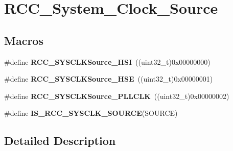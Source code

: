 \hypertarget{group___r_c_c___system___clock___source}{\section{R\-C\-C\-\_\-\-System\-\_\-\-Clock\-\_\-\-Source}
\label{group___r_c_c___system___clock___source}
}
\subsection*{Macros}
\begin{DoxyCompactItemize}
\item 
\hypertarget{group___r_c_c___system___clock___source_ga0f392254e74dd965c48edd5aad148e20}{\#define {\bfseries R\-C\-C\-\_\-\-S\-Y\-S\-C\-L\-K\-Source\-\_\-\-H\-S\-I}~((uint32\-\_\-t)0x00000000)}\label{group___r_c_c___system___clock___source_ga0f392254e74dd965c48edd5aad148e20}

\item 
\hypertarget{group___r_c_c___system___clock___source_gabeae110e41833842f8620647ea0ce85a}{\#define {\bfseries R\-C\-C\-\_\-\-S\-Y\-S\-C\-L\-K\-Source\-\_\-\-H\-S\-E}~((uint32\-\_\-t)0x00000001)}\label{group___r_c_c___system___clock___source_gabeae110e41833842f8620647ea0ce85a}

\item 
\hypertarget{group___r_c_c___system___clock___source_ga9301b7a07a7cb8c2c6ed87b619c1c966}{\#define {\bfseries R\-C\-C\-\_\-\-S\-Y\-S\-C\-L\-K\-Source\-\_\-\-P\-L\-L\-C\-L\-K}~((uint32\-\_\-t)0x00000002)}\label{group___r_c_c___system___clock___source_ga9301b7a07a7cb8c2c6ed87b619c1c966}

\item 
\#define {\bfseries I\-S\-\_\-\-R\-C\-C\-\_\-\-S\-Y\-S\-C\-L\-K\-\_\-\-S\-O\-U\-R\-C\-E}(S\-O\-U\-R\-C\-E)
\end{DoxyCompactItemize}


\subsection{Detailed Description}


